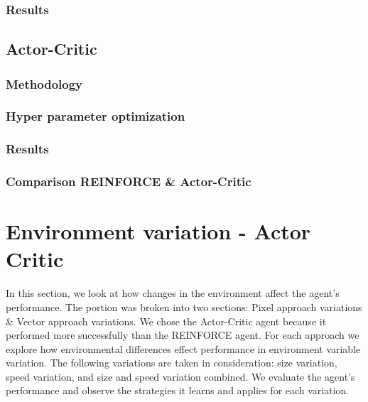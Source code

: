 \documentclass{article}
\begin{document}
\subsubsection{Results}
\label{R-Results}


\subsection{Actor-Critic}
\label{A-Actor-Critic}


\subsubsection{Methodology}
\label{AC-Method}

\subsubsection{Hyper parameter optimization}
\label{AC-HPO}

\subsubsection{Results}
\label{AC-Results}

\subsubsection{Comparison REINFORCE \& Actor-Critic}
\label{R/AC-Comparison}

\section{Environment variation - Actor Critic}
\label{Environment}
In this section, we look at how changes in the environment affect the agent's performance. 
The portion was broken into two sections: Pixel approach variations \& Vector approach variations.
We chose the Actor-Critic agent because it performed more successfully than the REINFORCE agent.
For each approach we explore how environmental differences effect performance in environment variable variation. 
The following variations are taken in consideration: size variation, speed variation, and size and speed variation combined.
We evaluate the agent's performance and observe the strategies it learns and applies for each variation.
\end{document}

